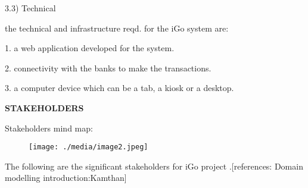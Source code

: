 \documentclass[12pt]{article}
\begin{document}
\vspace{\baselineskip}
3.3) Technical\par

the technical and infrastructure reqd. for the iGo system are:\par

1. a web application developed for the system.\par

2. connectivity with the banks to make the transactions.\par

3. a computer device which can be a tab, a kiosk or a desktop.\par


\vspace{\baselineskip}

\vspace{\baselineskip}
{\fontsize{18pt}{21.6pt}\selectfont \textbf{STAKEHOLDERS}\par}\par


\vspace{\baselineskip}
{\fontsize{14pt}{16.8pt}\selectfont Stakeholders mind map:\par}\par


\vspace{\baselineskip}

\vspace{\baselineskip}



\begin{figure}[H]
	\begin{Center}
		\texttt{[image: ./media/image2.jpeg]}
	\end{Center}
\end{figure}




\vspace{\baselineskip}

\vspace{\baselineskip}

\vspace{\baselineskip}
The following are the significant stakeholders for iGo project .[references: Domain modelling introduction:Kamthan]\par


\vspace{\baselineskip}
\end{document}
